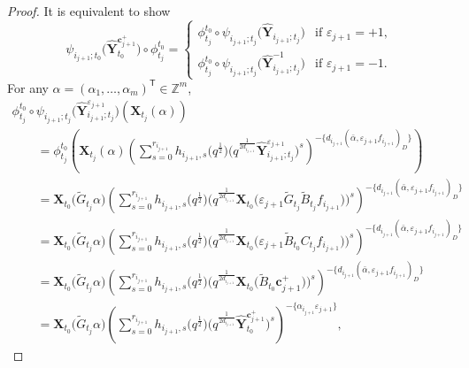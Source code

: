 \documentclass[10pt,a4paper]{amsart}
\numberwithin{equation}{section}
\begin{document}
\begin{proof}
It is equivalent to show
 \[
 \psi_{i_{j+1};t_{0}}\bigl(\mathbf{\hat{Y}}_{t_{0}}^{\mathbf{c}_{j+1}^{+}}\bigr)\circ\phi_{t_{j}}^{t_{0}}=\begin{cases}
 \phi_{t_{j}}^{t_{0}}\circ\psi_{i_{j+1};t_{j}}\bigl(\mathbf{\hat{Y}}_{i_{j+1};t_{j}}\bigr) & \text{if $\varepsilon_{j+1}=+1$},\\
 \phi_{t_{j}}^{t_{0}}\circ\psi_{i_{j+1};t_{j}}\bigl(\mathbf{\hat{Y}}^{-1}_{i_{j+1};t_{j}}\bigr) & \text{if $\varepsilon_{j+1}=-1$.}
 \end{cases}
 \]
 For any $\alpha=(\alpha_{1},\dots,\alpha_{m})^{\mathsf T}\in\mathbb{Z}^{m}$,
 \begin{gather*}
  \phi_{t_{j}}^{t_{0}}\circ\psi_{i_{j+1};t_{j}}\bigl(\mathbf{\hat{Y}}_{i_{j+1};t_{j}}^{\varepsilon_{j+1}}\bigr)(\mathbf{X}_{t_{j}}(\alpha))\\
  \qquad=\phi_{t_{j}}^{t_{0}}\left(\mathbf{X}_{t_{j}}(\alpha)\left(\sum\limits_{s=0}^{r_{i_{j+1}}} h_{i_{j+1},s}\bigl(q^{\frac{1}{2}}\bigr)\bigl(q^{\frac{1}{2d_{i_{j+1}}}}\mathbf{\hat{Y}}_{i_{j+1};t_{j}}^{\varepsilon_{j+1}}\bigr)^{s}\right)^{-\{d_{i_{j+1}}(\bar{\alpha},\varepsilon_{j+1}f_{i_{j+1}})_D\}}\right)\\
 \qquad =\mathbf{X}_{t_{0}}\bigl(\tilde{G}_{t_{j}}\alpha\bigr)\left(\sum\limits_{s=0}^{r_{i_{j+1}}} h_{i_{j+1},s}\bigl(q^{\frac{1}{2}}\bigr)\bigl(q^{\frac{1}{2d_{i_{j+1}}}}\mathbf{X}_{t_0}\bigl(\varepsilon_{j+1}\tilde{G}_{t_{j}}\tilde{B}_{t_{j}}f_{i_{j+1}}\bigr)\bigr)^{s}\right)^{-\{d_{i_{j+1}}(\bar{\alpha},\varepsilon_{j+1}f_{i_{j+1}})_D\}}\\
 \qquad =\mathbf{X}_{t_{0}}\bigl(\tilde{G}_{t_{j}}\alpha\bigr)\left(\sum\limits_{s=0}^{r_{i_{j+1}}} h_{i_{j+1},s}\bigl(q^{\frac{1}{2}}\bigr)\bigl(q^{\frac{1}{2d_{i_{j+1}}}}\mathbf{X}_{t_0}\bigl(\varepsilon_{j+1}\tilde{B}_{t_{0}}C_{t_{j}}f_{i_{j+1}}\bigr)\bigr)^{s}\right)^{-\{d_{i_{j+1}}(\bar{\alpha},\varepsilon_{j+1}f_{i_{j+1}})_D\}}\\
 \qquad =\mathbf{X}_{t_{0}}\bigl(\tilde{G}_{t_{j}}\alpha\bigr)\left(\sum\limits_{s=0}^{r_{i_{j+1}}} h_{i_{j+1},s}\bigl(q^{\frac{1}{2}}\bigr)\bigl(q^{\frac{1}{2d_{i_{j+1}}}}\mathbf{X}_{t_0}\bigl(\tilde{B}_{t_{0}}\mathbf{c}_{j+1}^{+}\bigr)\bigr)^{s}\right)^{-\{d_{i_{j+1}}(\bar{\alpha},\varepsilon_{j+1}f_{i_{j+1}})_D\}}\\
 \qquad =\mathbf{X}_{t_{0}}\bigl(\tilde{G}_{t_{j}}\alpha\bigr)\left(\sum\limits_{s=0}^{r_{i_{j+1}}} h_{i_{j+1},s}\bigl(q^{\frac{1}{2}}\bigr)\bigl(q^{\frac{1}{2d_{i_{j+1}}}}\mathbf{\hat{Y}}_{t_{0}}^{\mathbf{c}_{j+1}^{+}}\bigr)^{s}\right)^{-\{\alpha_{i_{j+1}}\varepsilon_{j+1}\}},

\end{gather*}
\end{proof}
\end{document}

